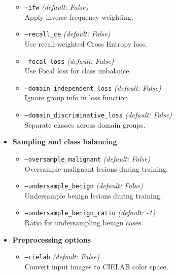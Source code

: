 \begin{itemize}
\begin{itemize}
        \item \texttt{---ifw} \hfill \textit{(default: False)} \\
        Apply inverse frequency weighting.

        \item \texttt{---recall\_ce} \hfill \textit{(default: False)} \\
        Use recall-weighted Cross Entropy loss.

        \item \texttt{---focal\_loss} \hfill \textit{(default: False)} \\
        Use Focal loss for class imbalance.

        \item \texttt{---domain\_independent\_loss} \hfill \textit{(default: False)} \\
        Ignore group info in loss function.

        \item \texttt{---domain\_discriminative\_loss} \hfill \textit{(default: False)} \\
        Separate classes across domain groups.
    \end{itemize}

    \item \textbf{Sampling and class balancing}
    \begin{itemize}
        \item \texttt{---oversample\_malignant} \hfill \textit{(default: False)} \\
        Oversample malignant lesions during training.

        \item \texttt{---undersample\_benign} \hfill \textit{(default: False)} \\
        Undersample benign lesions during training.

        \item \texttt{---undersample\_benign\_ratio} \hfill \textit{(default: -1)} \\
        Ratio for undersampling benign cases.
    \end{itemize}

    \item \textbf{Preprocessing options}
    \begin{itemize}
        \item \texttt{---cielab} \hfill \textit{(default: False)} \\
        Convert input images to CIELAB color space.


\end{itemize}
\end{itemize}
